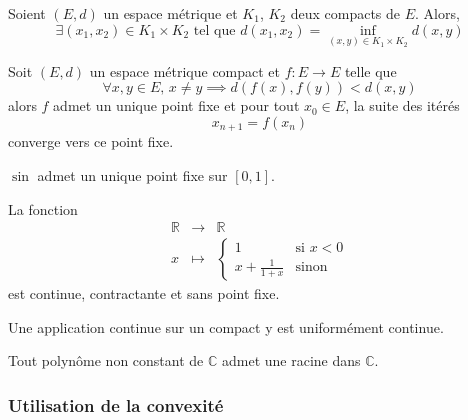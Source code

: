 
  \begin{corollary}
    Soient $(E, d)$ un espace métrique et $K_1$, $K_2$ deux compacts de $E$. Alors,
    \[ \exists (x_1, x_2) \in K_1 \times K_2 \text{ tel que } d(x_1, x_2) = \inf_{(x,y) \in K_1 \times K_2} d(x,y) \]
  \end{corollary}


  \begin{corollary}
    Soit $(E,d)$ un espace métrique compact et $f : E \rightarrow E$ telle que
    \[ \forall x, y \in E, \, x \neq y \implies d(f(x), f(y)) < d(x,y) \]
    alors $f$ admet un unique point fixe et pour tout $x_0 \in E$, la suite des itérés
    \[ x_{n+1} = f(x_n) \]
    converge vers ce point fixe.
  \end{corollary}

  \begin{example}
    $\sin$ admet un unique point fixe sur $[0,1]$.
  \end{example}


  \begin{cexample}
    La fonction
    \[
    \begin{array}{ccc}
      \mathbb{R} &\rightarrow& \mathbb{R} \\
      x &\mapsto& \begin{cases}
        1 &\text{si } x < 0 \\
        x + \frac{1}{1+x} &\text{sinon}
      \end{cases}
    \end{array}
    \]
    est continue, contractante et sans point fixe.
  \end{cexample}


  \begin{corollary}
    Une application continue sur un compact y est uniformément continue.
  \end{corollary}


  \begin{application}
    Tout polynôme non constant de $\mathbb{C}$ admet une racine dans $\mathbb{C}$.
  \end{application}

  \subsubsection{Utilisation de la convexité}


